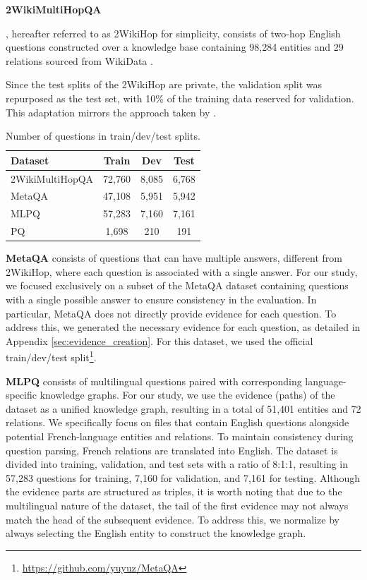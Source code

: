 \documentclass[11pt]{article}
\begin{document}
\noindent
\textbf{2WikiMultiHopQA} 

\cite{ho2020multihopqa}, hereafter referred to as 2WikiHop for simplicity, consists of two-hop English questions constructed over a knowledge base containing 98,284 entities and 29 relations sourced from WikiData \cite{vrandevcic2014wikidata}. 
 
Since the test splits of the 2WikiHop are private, the validation split was repurposed as the test set, with 10\% of the training data reserved for validation. This adaptation mirrors the approach taken by \citet{misra2023triggeringmultihopreasoningquestion}. 


\begin{table}[t]
\setlength{\tabcolsep}{3.5pt}
\centering
\small
\begin{tabularx}{\columnwidth}{Xccc}
\toprule
Dataset & Train & Dev & Test  \\ 
\midrule
2Wiki\-MultiHopQA & 72,760 & 8,085 & 6,768 \\
MetaQA & 47,108 & 5,951 & 5,942 \\
MLPQ & 57,283 & 7,160 & 7,161 \\
PQ & 1,698 & 210 & 191 \\
\bottomrule
\end{tabularx}
\caption{Number of questions in train/dev/test splits.}
\label{tab:num_questions}
\end{table}

\noindent
\textbf{MetaQA} consists of questions that can have multiple answers, different from 2WikiHop, where each question is associated with a single answer. For our study, we focused exclusively on a subset of the MetaQA dataset containing questions with a single possible answer to ensure consistency in the evaluation.
In particular, MetaQA does not directly provide evidence for each question. To address this, we generated the necessary evidence for each question, as detailed in Appendix \ref{sec:evidence_creation}. For this dataset, we used the official train/dev/test split\footnote{\href{https://github.com/yuyuz/MetaQA}{https://github.com/yuyuz/MetaQA}}.

\noindent
\textbf{MLPQ} \cite{mlpq2023} consists of multilingual questions paired with corresponding language-specific knowledge graphs. For our study, we use the evidence (paths) of the dataset as a unified knowledge graph, resulting in a total of 51,401 entities and 72 relations. We specifically focus on files that contain English questions alongside potential French-language entities and relations. To maintain consistency during question parsing, French relations are translated into English. The dataset is divided into training, validation, and test sets with a ratio of 8:1:1, resulting in 57,283 questions for training, 7,160 for validation, and 7,161 for testing. Although the evidence parts are structured as triples, it is worth noting that due to the multilingual nature of the dataset, the tail of the first evidence may not always match the head of the subsequent evidence. To address this, we normalize by always selecting the English entity to construct the knowledge graph.
\end{document}
